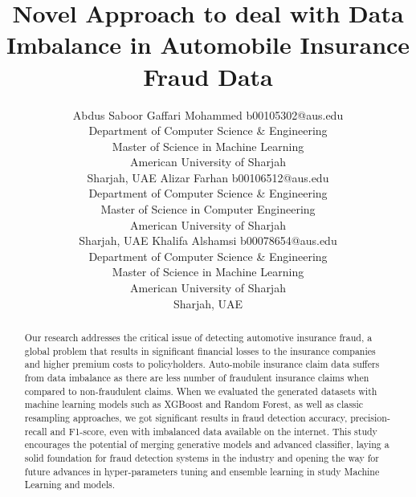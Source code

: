 \documentclass[twoside,11pt]{article}
\begin{document}
\title{Novel Approach to deal with Data Imbalance in Automobile Insurance Fraud Data}

\author{\name Abdus Saboor Gaffari Mohammed \email b00105302@aus.edu \\
        \addr Department of Computer Science \& Engineering\\
        Master of Science in Machine Learning\\
        American University of Sharjah\\
        Sharjah, UAE
        \AND
        \name Alizar Farhan \email b00106512@aus.edu \\
        \addr Department of Computer Science \& Engineering\\
        Master of Science in Computer Engineering\\
        American University of Sharjah\\
        Sharjah, UAE
        \AND
        \name Khalifa Alshamsi \email b00078654@aus.edu \\
        \addr Department of Computer Science \& Engineering\\
        Master of Science in Machine Learning\\
        American University of Sharjah\\
        Sharjah, UAE
       } 

\maketitle

\begin{abstract}%

Our research addresses the critical issue of detecting automotive insurance fraud, a global problem that results in significant financial losses to the insurance companies and higher premium costs to policyholders. Auto-mobile insurance claim data suffers from data imbalance as there are less number of fraudulent insurance claims when compared to non-fraudulent claims. When we evaluated the generated datasets with machine learning models such as XGBoost and Random Forest, as well as classic resampling approaches, we got significant results in fraud detection accuracy, precision-recall and F1-score, even with imbalanced data available on the internet. This study encourages  the potential of merging generative models and advanced classifier, laying a solid foundation for fraud detection systems in the industry and opening the way for future advances in hyper-parameters tuning and ensemble learning in study Machine Learning and models.

\end{abstract}
\end{document}
